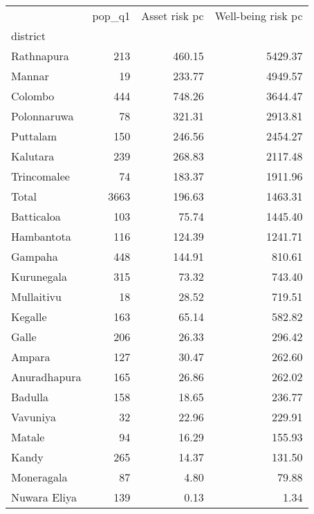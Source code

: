 \begin{tabular}{lrrr}
\toprule
{} &  pop\_q1 &  Asset risk pc &  Well-being risk pc \\
district     &         &                &                     \\
\midrule
Rathnapura   &     213 &         460.15 &             5429.37 \\
Mannar       &      19 &         233.77 &             4949.57 \\
Colombo      &     444 &         748.26 &             3644.47 \\
Polonnaruwa  &      78 &         321.31 &             2913.81 \\
Puttalam     &     150 &         246.56 &             2454.27 \\
Kalutara     &     239 &         268.83 &             2117.48 \\
Trincomalee  &      74 &         183.37 &             1911.96 \\
Total        &    3663 &         196.63 &             1463.31 \\
Batticaloa   &     103 &          75.74 &             1445.40 \\
Hambantota   &     116 &         124.39 &             1241.71 \\
Gampaha      &     448 &         144.91 &              810.61 \\
Kurunegala   &     315 &          73.32 &              743.40 \\
Mullaitivu   &      18 &          28.52 &              719.51 \\
Kegalle      &     163 &          65.14 &              582.82 \\
Galle        &     206 &          26.33 &              296.42 \\
Ampara       &     127 &          30.47 &              262.60 \\
Anuradhapura &     165 &          26.86 &              262.02 \\
Badulla      &     158 &          18.65 &              236.77 \\
Vavuniya     &      32 &          22.96 &              229.91 \\
Matale       &      94 &          16.29 &              155.93 \\
Kandy        &     265 &          14.37 &              131.50 \\
Moneragala   &      87 &           4.80 &               79.88 \\
Nuwara Eliya &     139 &           0.13 &                1.34 \\
\bottomrule
\end{tabular}
